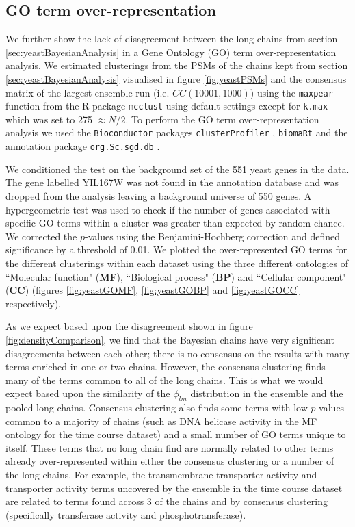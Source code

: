\documentclass[]{article}
\begin{document}
\subsection{GO term over-representation} \label{sec:goTermOverRep}
We further show the lack of disagreement between the long chains from section \ref{sec:yeastBayesianAnalysis} in a Gene Ontology (GO) term over-representation analysis. We estimated clusterings from the PSMs of the chains kept from section \ref{sec:yeastBayesianAnalysis} visualised in figure \ref{fig:yeastPSMs} and the consensus matrix of the largest ensemble run (i.e. $CC(10001, 1000)$) using the \texttt{maxpear} function from the R package \texttt{mcclust} \cite{fritsch2012mcclust} using default settings except for \texttt{k.max} which was set to 275 $\approx N/2$. To perform the GO term over-representation analysis we used the \texttt{Bioconductor} packages \texttt{clusterProfiler} \citep{yu2012clusterProfiler}, \texttt{biomaRt} \citep{durinck2009mapping} and the annotation package \texttt{org.Sc.sgd.db} \citep{carlson2014org}.

We conditioned the test on the background set of the 551 yeast genes in the data. The gene labelled YIL167W was not found in the annotation database and was dropped from the analysis leaving a background universe of 550 genes. A hypergeometric test was used to check if the number of genes associated with specific GO terms within a cluster was greater than expected by random chance. We corrected the $p$-values using the Benjamini-Hochberg correction \citep{benjamini1995controlling} and defined significance by a threshold of 0.01. We plotted the over-represented GO terms for the different clusterings within each dataset using the three different ontologies of ``Molecular function" (\textbf{MF}), ``Biological process" (\textbf{BP}) and ``Cellular component" (\textbf{CC}) (figures \ref{fig:yeastGOMF}, \ref{fig:yeastGOBP} and \ref{fig:yeastGOCC} respectively). 

As we expect based upon the disagreement shown in figure \ref{fig:densityComparison}, we find that the Bayesian chains have very significant disagreements between each other; there is no consensus on the results with many terms enriched in one or two chains. However, the consensus clustering finds many of the terms common to all of the long chains. This is what we would expect based upon the similarity of the $\phi_{lm}$ distribution in the ensemble and the pooled long chains. Consensus clustering also finds some terms with low $p$-values common to a majority of chains (such as DNA helicase activity in the MF ontology for the time course  dataset) and a small number of GO terms unique to itself. These terms that no long chain find are normally related to other terms already over-represented within either the consensus clustering or a number of the long chains. For example, the transmembrane transporter activity and transporter activity terms uncovered by the ensemble in the time course  dataset are related to terms found across 3 of the chains and by consensus clustering (specifically transferase activity and phosphotransferase). 
\end{document}
